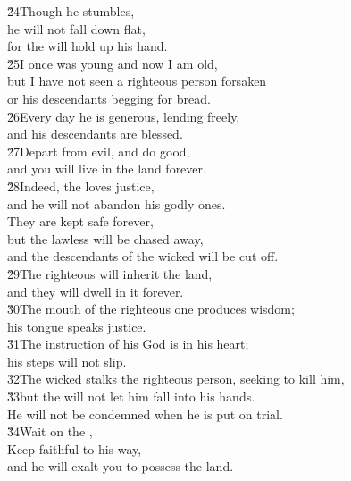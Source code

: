 \begin{poetry}
\poeml \v{24}Though he stumbles, \\
\poemll    he will not fall down flat, \\
\poemlll       for the  will hold up his hand. \\
\poeml \v{25}I once was young and now I am old, \\
\poemll    but I have not seen a righteous person forsaken \\
\poemlll       or his descendants begging for bread. \\
\poeml \v{26}Every day he is generous, lending freely, \\
\poemll    and his descendants are blessed. \\
\poeml \v{27}Depart from evil, and do good, \\
\poemll    and you will live in the land forever. \\
\poeml \v{28}Indeed, the  loves justice, \\
\poemll    and he will not abandon his godly ones. \\
\poeml They are kept safe forever, \\
\poemll    but the lawless will be chased away, \\
\poemlll       and the descendants of the wicked will be cut off. \\
\poeml \v{29}The righteous will inherit the land, \\
\poemll    and they will dwell in it forever. \\
\poeml \v{30}The mouth of the righteous one produces wisdom; \\
\poemll    his tongue speaks justice. \\
\poeml \v{31}The instruction of his God is in his heart; \\
\poemll    his steps will not slip. \\
\poeml \v{32}The wicked stalks the righteous person, seeking to kill him, \\
\poeml \v{33}but the  will not let him fall into his hands. \\
\poemlll       He will not be condemned when he is put on trial. \\
\poeml \v{34}Wait on the , \\
\poemll    Keep faithful to his way, \\
\poemlll       and he will exalt you to possess the land. \\

\end{poetry}
